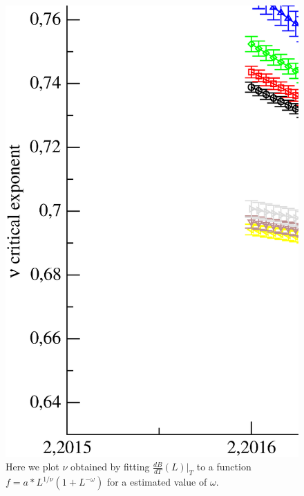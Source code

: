 \begin{figure}[!htpb]
  \centering
  \includegraphics[width=\textwidth]{./plots/3DXY/vsT/nu.eps}
  \caption{Here we plot $\nu$ obtained by fitting $\frac{dB}{dT}(L)|_T$ to a function $f = a*L^{1/\nu}(1+L^{-\omega})$ for a estimated value of $\omega$. }
\end{figure}


